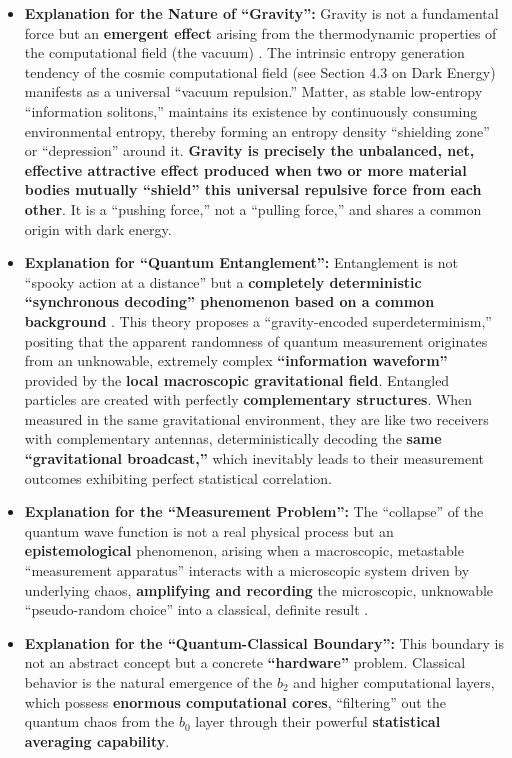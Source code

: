 \documentclass[11pt, a4paper]{article}
\begin{document}
\begin{itemize}
    \item \textbf{Explanation for the Nature of ``Gravity'':}
    Gravity is not a fundamental force but an \textbf{emergent effect} arising from the thermodynamic properties of the computational field (the vacuum) \cite{Newton1687}. The intrinsic entropy generation tendency of the cosmic computational field (see Section 4.3 on Dark Energy) manifests as a universal ``vacuum repulsion.'' Matter, as stable low-entropy ``information solitons,'' maintains its existence by continuously consuming environmental entropy, thereby forming an entropy density ``shielding zone'' or ``depression'' around it. \textbf{Gravity is precisely the unbalanced, net, effective attractive effect produced when two or more material bodies mutually ``shield'' this universal repulsive force from each other}. It is a ``pushing force,'' not a ``pulling force,'' and shares a common origin with dark energy.

    \item \textbf{Explanation for ``Quantum Entanglement'':}
    Entanglement is not ``spooky action at a distance'' but a \textbf{completely deterministic ``synchronous decoding'' phenomenon based on a common background} \cite{Bell1964}. This theory proposes a ``gravity-encoded superdeterminism,'' positing that the apparent randomness of quantum measurement originates from an unknowable, extremely complex \textbf{``information waveform''} provided by the \textbf{local macroscopic gravitational field}. Entangled particles are created with perfectly \textbf{complementary structures}. When measured in the same gravitational environment, they are like two receivers with complementary antennas, deterministically decoding the \textbf{same ``gravitational broadcast,''} which inevitably leads to their measurement outcomes exhibiting perfect statistical correlation.

    \item \textbf{Explanation for the ``Measurement Problem'':}
    The ``collapse'' of the quantum wave function is not a real physical process but an \textbf{epistemological} phenomenon, arising when a macroscopic, metastable ``measurement apparatus'' interacts with a microscopic system driven by underlying chaos, \textbf{amplifying and recording} the microscopic, unknowable ``pseudo-random choice'' into a classical, definite result \cite{deBroglie1930}.

    \item \textbf{Explanation for the ``Quantum-Classical Boundary'':}
    This boundary is not an abstract concept but a concrete \textbf{``hardware''} problem. Classical behavior is the natural emergence of the $b_2$ and higher computational layers, which possess \textbf{enormous computational cores}, ``filtering'' out the quantum chaos from the $b_0$ layer through their powerful \textbf{statistical averaging capability}.


\end{itemize}
\end{document}
